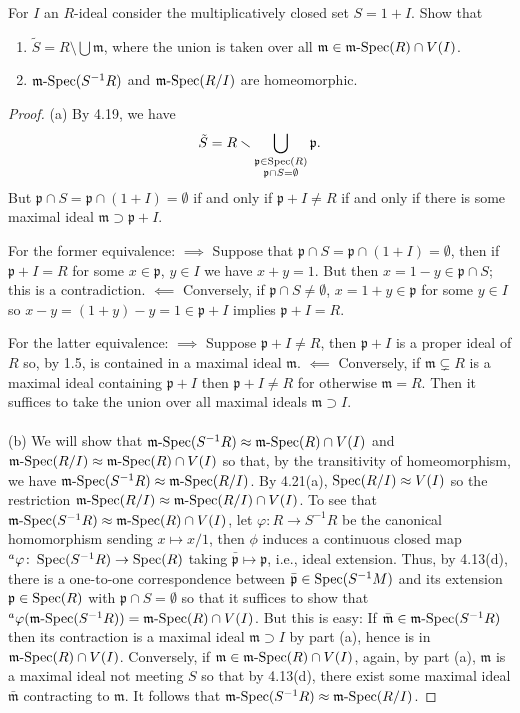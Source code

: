 \begin{problem}
For $I$ an $R$-ideal consider the multiplicatively
closed set $S=1+I$. Show that
\begin{enumerate}[noitemsep,label=(\alph*)]
\item $\tilde S=R\setminus\bigcup\mathfrak{m}$, where the
  union is taken over all
  $\mathfrak{m}\in\operatorname{\mathfrak{m}-Spec}(R)\cap V(I)$.
\item $\operatorname{\mathfrak{m}-Spec}(S^{-1}R)$ and $\operatorname{\mathfrak{m}-Spec}(R/I)$ are homeomorphic.
\end{enumerate}
\end{problem}
\begin{proof}
(a) By 4.19, we have
\[
\tilde
S=R\smallsetminus\bigcup_{\substack{\mathfrak{p}\in\operatorname{Spec}(R)\\\mathfrak{p}\cap
  S=\emptyset}}\mathfrak{p}.
\]
But $\mathfrak{p}\cap S=\mathfrak{p}\cap (1+I)=\emptyset$ if and
only if $\mathfrak{p}+I\neq R$ if and only if there is some
maximal ideal $\mathfrak{m}\supset \mathfrak{p}+I$.

For the former equivalence: $\implies$ Suppose that
$\mathfrak{p}\cap S=\mathfrak{p}\cap(1+I)=\emptyset$, then if
$\mathfrak{p}+I=R$ for some $x\in\mathfrak{p}$, $y\in I$ we have
$x+y=1$. But then $x=1-y\in\mathfrak{p}\cap S$; this is a
contradiction. $\impliedby$ Conversely, if
$\mathfrak{p}\cap S\neq\emptyset$, $x=1+y\in\mathfrak{p}$ for some
$y\in I$ so $x-y=(1+y)-y=1\in\mathfrak{p}+I$ implies
$\mathfrak{p}+I=R$.

For the latter equivalence: $\implies$ Suppose $\mathfrak{p}+I\neq R$,
then $\mathfrak{p}+I$ is a proper ideal of $R$ so, by 1.5, is
contained in a maximal ideal $\mathfrak{m}$. $\impliedby$ Conversely,
if $\mathfrak{m}\subsetneq R$ is a maximal ideal containing
$\mathfrak{p}+I$ then $\mathfrak{p}+I\neq R$ for otherwise
$\mathfrak{m}=R$. Then it suffices to take the union over all maximal
ideals $\mathfrak{m}\supset I$.
\\\\
(b) We will show that $\operatorname{\mathfrak{m}-Spec}(S^{-1}R)\approx\operatorname{\mathfrak{m}-Spec}(R)\cap V(I)$ and
$\operatorname{\mathfrak{m}-Spec}(R/I)\approx\operatorname{\mathfrak{m}-Spec}(R)\cap V(I)$ so that, by the transitivity of
homeomorphism, we have $\operatorname{\mathfrak{m}-Spec}(S^{-1}R)\approx\operatorname{\mathfrak{m}-Spec}(R/I)$. By
4.21(a), $\operatorname{Spec}(R/I)\approx V(I)$ so the restriction
$\operatorname{\mathfrak{m}-Spec}(R/I)\approx\operatorname{\mathfrak{m}-Spec}(R/I)\cap V(I)$. To see that
$\operatorname{\mathfrak{m}-Spec}(S^{-1}R)\approx\operatorname{\mathfrak{m}-Spec}(R)\cap V(I)$, let $\varphi\colon R\to
S^{-1}R$ be the canonical homomorphism sending $x\mapsto x/1$, then
$\phi$ induces a continuous closed map
$^a\varphi\colon\operatorname{Spec}(S^{-1}R)\to\operatorname{Spec}(R)$ taking
$\bar{\mathfrak{p}}\mapsto\mathfrak{p}$, i.e., ideal extension. Thus,
by 4.13(d), there is a one-to-one correspondence between
$\bar{\mathfrak{p}}\in\operatorname{Spec}(S^{-1}M)$ and its extension
$\mathfrak{p}\in\operatorname{Spec}(R)$ with $\mathfrak{p}\cap S=\emptyset$ so that
it suffices to show that $^a\varphi(\operatorname{\mathfrak{m}-Spec}(S^{-1}R))=\operatorname{\mathfrak{m}-Spec}(R)\cap
V(I)$. But this is easy: If $\bar{\mathfrak{m}}\in\operatorname{\mathfrak{m}-Spec}(S^{-1}R)$
then its contraction is a maximal ideal $\mathfrak{m}\supset I$ by
part (a), hence is in $\operatorname{\mathfrak{m}-Spec}(R)\cap V(I)$. Conversely, if
$\mathfrak{m}\in\operatorname{\mathfrak{m}-Spec}(R)\cap V(I)$, again, by part (a),
$\mathfrak{m}$ is a maximal ideal not meeting $S$ so that by 4.13(d),
there exist some maximal ideal $\bar{\mathfrak{m}}$ contracting to
$\mathfrak{m}$. It follows that $\operatorname{\mathfrak{m}-Spec}(S^{-1}R)\approx\operatorname{\mathfrak{m}-Spec}(R/I)$.
\end{proof}
